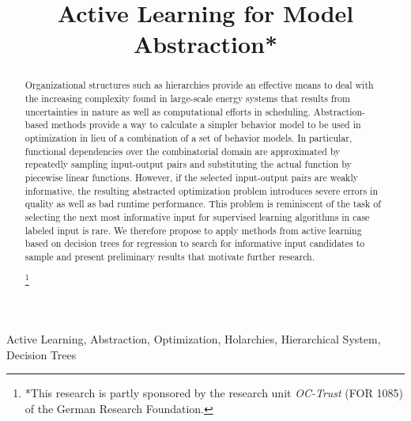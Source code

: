 \documentclass[conference]{IEEEtran}
\newcommand{\noteg}[1]{\sethlcolor{highlightgreen} \hl{\textbf{NOTE:} #1}}
\newcommand\blfootnote[1]{%
  \begingroup
  \renewcommand\thefootnote{}\footnote{#1}%
  \addtocounter{footnote}{-1}%
  \endgroup
}
\begin{document}
\title{Active Learning for Model Abstraction*}

\author{
}

\maketitle

\begin{abstract}
Organizational structures such as hierarchies provide an effective means to
deal with the increasing complexity found in large-scale energy systems that 
results from uncertainties in nature as well as computational efforts in scheduling. 
Abstraction-based methods provide a way to calculate a simpler behavior model 
to be used in optimization in lieu of a combination of a set of behavior models.
In particular, functional dependencies over the combinatorial domain 
are approximated by repeatedly sampling input-output pairs
and substituting the actual function by piecewise linear functions. However, if
the selected input-output pairs are weakly informative, the resulting abstracted
optimization problem introduces severe errors in quality as well as bad runtime performance.
This problem is reminiscent of the task of selecting the next most informative input for supervised learning
algorithms in case labeled input is rare.
We therefore propose to apply methods from active learning based on decision trees for regression
to search for informative
input candidates to sample and present preliminary results that motivate further research. 

\blfootnote{*This research is partly sponsored by the research unit \emph{OC-Trust} (FOR 1085) of the German Research Foundation.}
\end{abstract}

\begin{IEEEkeywords}
Active Learning, Abstraction, Optimization, Holarchies, Hierarchical System, Decision Trees
\end{IEEEkeywords}
\end{document}
